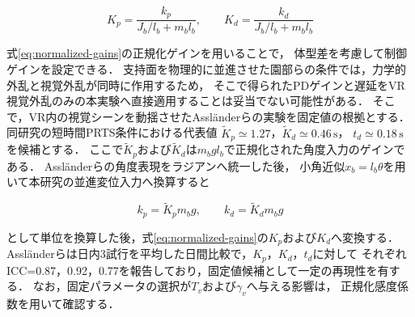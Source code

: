 \documentclass[a4paper,9pt,twocolumn]{ltjsarticle}
\begin{document}
\begin{equation}
  K_p=\frac{k_p}{J_b/l_b+m_b l_b},\qquad
  K_d=\frac{k_d}{J_b/l_b+m_b l_b}
  \label{eq:normalized-gains}
\end{equation}

式\eqref{eq:normalized-gains}の正規化ゲインを用いることで，
体型差を考慮して制御ゲインを設定できる．
支持面を物理的に並進させた園部らの条件では，力学的外乱と視覚外乱が同時に作用するため，
そこで得られたPDゲインと遅延をVR視覚外乱のみの本実験へ直接適用することは妥当でない可能性がある．
そこで，VR内の視覚シーンを動揺させたAssl\"anderらの実験を固定値の根拠とする\cite{asslaender2023}．
同研究の短時間PRTS条件における代表値
$\widetilde{K}_p\simeq1.27$，$\widetilde{K}_d\simeq0.46\,\mathrm{s}$，
$t_d\simeq0.18\,\mathrm{s}$を候補とする．
ここで$\widetilde{K}_p$および$\widetilde{K}_d$は$m_b g l_b$で正規化された角度入力のゲインである．
Assl\"anderらの角度表現をラジアンへ統一した後，
小角近似$x_b=l_b\theta$を用いて本研究の並進変位入力へ換算すると

\begin{equation}
  k_p=\widetilde{K}_p m_b g,\qquad
  k_d=\widetilde{K}_d m_b g
  \label{eq:gain-conversion}
\end{equation}

として単位を換算した後，式\eqref{eq:normalized-gains}の$K_p$および$K_d$へ変換する．
Assl\"anderらは日内3試行を平均した日間比較で，$K_p$，$K_d$，$t_d$に対して
それぞれICC=0.87，0.92，0.77を報告しており，固定値候補として一定の再現性を有する\cite{asslaender2023}．
なお，固定パラメータの選択が$T_v$および$\gamma_v$へ与える影響は，
正規化感度係数を用いて確認する．
\end{document}
